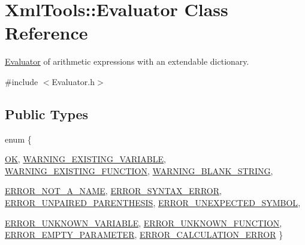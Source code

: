 \hypertarget{class_xml_tools_1_1_evaluator}{
\section{XmlTools::Evaluator Class Reference}
\label{class_xml_tools_1_1_evaluator}
}


\hyperlink{class_xml_tools_1_1_evaluator}{Evaluator} of arithmetic expressions with an extendable dictionary.  


{\ttfamily \#include $<$Evaluator.h$>$}\subsection*{Public Types}
\begin{DoxyCompactItemize}
\item 
enum \{ \par
\hyperlink{class_xml_tools_1_1_evaluator_a83556834c4fd68f4836782936cc29a6ba22108999c735ca50a4990bb9044ca164}{OK}, 
\hyperlink{class_xml_tools_1_1_evaluator_a83556834c4fd68f4836782936cc29a6badbd98a84392f1db7674537e1f46e82e6}{WARNING\_\-EXISTING\_\-VARIABLE}, 
\hyperlink{class_xml_tools_1_1_evaluator_a83556834c4fd68f4836782936cc29a6ba767ec14ec0d51b108af00f443450e7c1}{WARNING\_\-EXISTING\_\-FUNCTION}, 
\hyperlink{class_xml_tools_1_1_evaluator_a83556834c4fd68f4836782936cc29a6baa2b45925fd62e0af9c3261ddb2ee093e}{WARNING\_\-BLANK\_\-STRING}, 
\par
\hyperlink{class_xml_tools_1_1_evaluator_a83556834c4fd68f4836782936cc29a6ba621a09cd3a88b3d65599f643b37183e5}{ERROR\_\-NOT\_\-A\_\-NAME}, 
\hyperlink{class_xml_tools_1_1_evaluator_a83556834c4fd68f4836782936cc29a6babfe81983da70c8317f20aefecec1e07a}{ERROR\_\-SYNTAX\_\-ERROR}, 
\hyperlink{class_xml_tools_1_1_evaluator_a83556834c4fd68f4836782936cc29a6ba4862b32a9f8e62b35180c7b922b169d0}{ERROR\_\-UNPAIRED\_\-PARENTHESIS}, 
\hyperlink{class_xml_tools_1_1_evaluator_a83556834c4fd68f4836782936cc29a6bac18e89dc11c21d9d4bf970630fa9b073}{ERROR\_\-UNEXPECTED\_\-SYMBOL}, 
\par
\hyperlink{class_xml_tools_1_1_evaluator_a83556834c4fd68f4836782936cc29a6baf55b8dd359ea08977cdb021be1895023}{ERROR\_\-UNKNOWN\_\-VARIABLE}, 
\hyperlink{class_xml_tools_1_1_evaluator_a83556834c4fd68f4836782936cc29a6bac51246c5f76673dd1cb9bd5302403858}{ERROR\_\-UNKNOWN\_\-FUNCTION}, 
\hyperlink{class_xml_tools_1_1_evaluator_a83556834c4fd68f4836782936cc29a6bad4291c0ebd5c6b036ec7ac842cda5b29}{ERROR\_\-EMPTY\_\-PARAMETER}, 
\hyperlink{class_xml_tools_1_1_evaluator_a83556834c4fd68f4836782936cc29a6ba3414a1f123c2ee682d4700245c9b37e3}{ERROR\_\-CALCULATION\_\-ERROR}
 \}
\end{DoxyCompactItemize}
